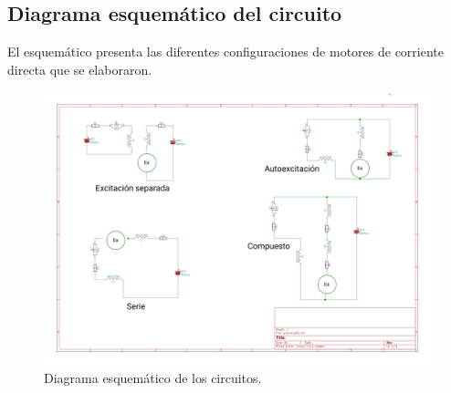 \subsection{Diagrama esquem\'atico del circuito}
El esquem\'atico presenta las diferentes configuraciones de motores de corriente directa que se elaboraron.

 \begin{figure}[!htbp]
 \caption{Diagrama esquem\'atico de los circuitos.}
 \centering
 \includegraphics [scale=0.35]
 {./img/practica05.png}
 \end{figure}
